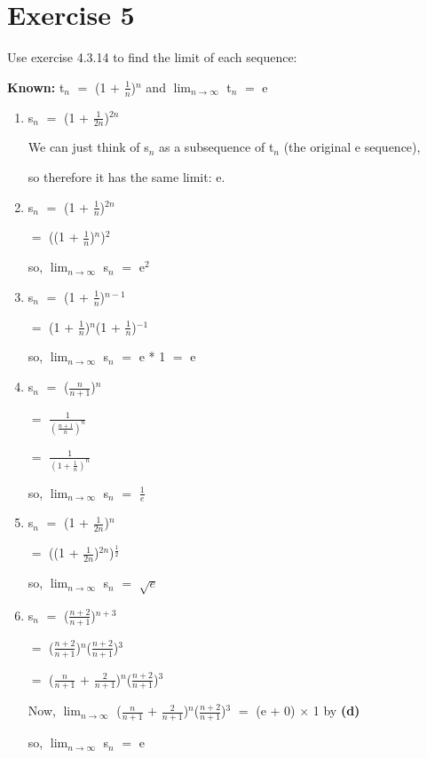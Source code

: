 \documentclass{article}
\newcommand{\mt}[1]{\ensuremath{#1}}
\newcommand\bsc[2][\DefaultOpt]{%
  \def\DefaultOpt{#2}%
  \section[#1]{#2}%
}
\newcommand{\balist}{\begin{enumerate}[label=\alph*.]}
\newcommand{\elist}{\end{enumerate}}
\newcommand{\bpth}[1]{\textbf{(#1)}}
\newcommand{\prn}[1]{(#1)}
\newcommand{\ps}{\mt{+} }
\newcommand{\eql}{\mt{=} }
\newcommand{\uw}[2]{#1\mt{_{#2}}}
\newcommand{\frc}[2]{\mt{\frac{#1}{#2}}}
\newcommand{\lmti}[1]{\mt{\displaystyle{\lim_{#1 \to \infty}}}}
\begin{document}
\bsc{Exercise 5}{

Use exercise 4.3.14 to find the limit of each sequence:

\textbf{Known:} \uw{t}{n} \eql \prn{1 \ps \frc{1}{n}}$^n$  and \lmti{n} \uw{t}{n} \eql e

\balist
\item \uw{s}{n} \eql (1 + \frc{1}{2n})$^{2n}$
	
	We can just think of \uw{s}{n} as a subsequence of \uw{t}{n} (the original e sequence),
	
	so therefore it has the same limit: e.
\item \uw{s}{n} \eql (1 + \frc{1}{n})$^{2n}$
	
	\eql ((1 + \frc{1}{n})$^n$)$^2$
	
	so, \lmti{n} \uw{s}{n} \eql e$^2$
\item \uw{s}{n} \eql (1 + \frc{1}{n})$^{n - 1}$

	\eql (1 + \frc{1}{n})$^{n}$(1 + \frc{1}{n})$^{-1}$
	
	so, \lmti{n} \uw{s}{n} \eql e * 1 \eql e
\item \uw{s}{n} \eql (\frc{n	}{n + 1})$^{n}$
	
	\eql \frc{1}{(\frc{n + 1}{n})^n}
	
	\eql \frc{1}{(1 + \frc{1}{n})^n}
	
	so, \lmti{n} \uw{s}{n} \eql \frc{1}{e}
\item \uw{s}{n} \eql (1 + \frc{1	}{2n})$^{n}$
	
	\eql ((1 + \frc{1}{2n})$^{2n}$)$^\frac{1}{2}$
	
	so, \lmti{n} \uw{s}{n} \eql $\sqrt{e}$
	
\item \uw{s}{n} \eql (\frc{n + 2	}{n + 1})$^{n + 3}$
	
	\eql (\frc{n + 2}{n + 1})$^{n}$(\frc{n + 2	}{n + 1})$^{3}$
	
	\eql (\frc{n}{n + 1} \ps \frc{2}{n + 1})$^{n}$(\frc{n + 2	}{n + 1})$^{3}$
	
	Now, \lmti{n} (\frc{n}{n + 1} \ps \frc{2}{n + 1})$^{n}$(\frc{n + 2	}{n + 1})$^{3}$ \eql (e + 0) $\times$ 1 by \bpth{d}
	
	so, \lmti{n} \uw{s}{n} \eql e
\elist

}
\end{document}
